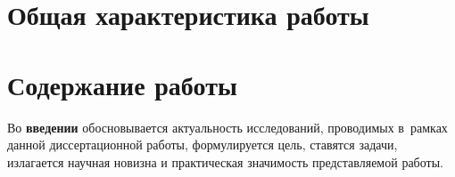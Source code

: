 \section*{Общая характеристика работы}

\newcommand{\actuality}{\pdfbookmark[1]{Актуальность}{actuality}\underline{\textbf{\actualityTXT}}}
\newcommand{\progress}{\pdfbookmark[1]{Разработанность темы}{progress}\underline{\textbf{\progressTXT}}}
\newcommand{\aim}{\pdfbookmark[1]{Цели}{aim}\underline{{\textbf\aimTXT}}}
\newcommand{\tasks}{\pdfbookmark[1]{Задачи}{tasks}\underline{\textbf{\tasksTXT}}}
\newcommand{\aimtasks}{\pdfbookmark[1]{Цели и задачи}{aimtasks}\aimtasksTXT}
\newcommand{\novelty}{\pdfbookmark[1]{Научная новизна}{novelty}\underline{\textbf{\noveltyTXT}}}
\newcommand{\influence}{\pdfbookmark[1]{Практическая значимость}{influence}\underline{\textbf{\influenceTXT}}}
\newcommand{\methods}{\pdfbookmark[1]{Методология и методы исследования}{methods}\underline{\textbf{\methodsTXT}}}
\newcommand{\defpositions}{\pdfbookmark[1]{Положения, выносимые на защиту}{defpositions}\underline{\textbf{\defpositionsTXT}}}
\newcommand{\reliability}{\pdfbookmark[1]{Достоверность}{reliability}\underline{\textbf{\reliabilityTXT}}}
\newcommand{\probation}{\pdfbookmark[1]{Апробация}{probation}\underline{\textbf{\probationTXT}}}
\newcommand{\contribution}{\pdfbookmark[1]{Личный вклад}{contribution}\underline{\textbf{\contributionTXT}}}
\newcommand{\publications}{\pdfbookmark[1]{Публикации}{publications}\underline{\textbf{\publicationsTXT}}}




\section*{Содержание работы}
Во \textbf{введении} обосновывается актуальность исследований, проводимых в~рамках данной диссертационной работы, формулируется цель, ставятся задачи, излагается научная новизна и практическая значимость представляемой работы.

